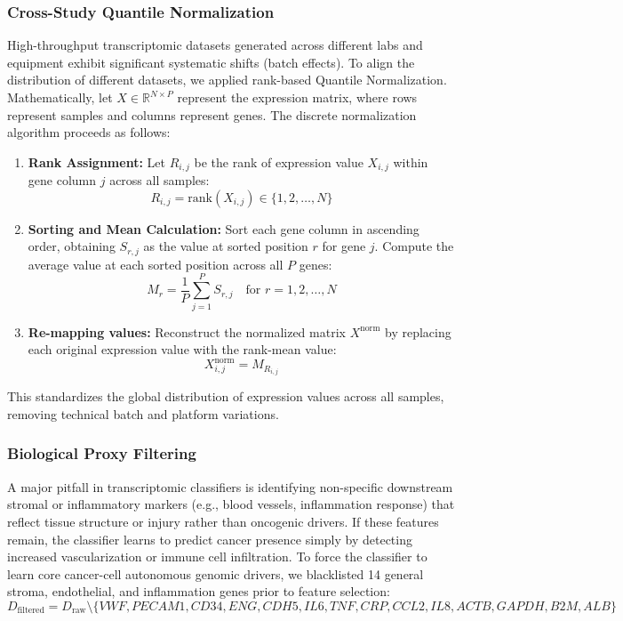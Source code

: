 \documentclass[journal,10pt]{IEEEtran}
\begin{document}
\subsubsection{Cross-Study Quantile Normalization}
High-throughput transcriptomic datasets generated across different labs and equipment exhibit significant systematic shifts (batch effects). To align the distribution of different datasets, we applied rank-based Quantile Normalization. Mathematically, let $X \in \mathbb{R}^{N \times P}$ represent the expression matrix, where rows represent samples and columns represent genes. The discrete normalization algorithm proceeds as follows:
\begin{enumerate}
    \item \textbf{Rank Assignment:} Let $R_{i,j}$ be the rank of expression value $X_{i,j}$ within gene column $j$ across all samples:
    \begin{equation}
    R_{i,j} = \text{rank}(X_{i,j}) \in \{1, 2, \dots, N\}
    \end{equation}
    \item \textbf{Sorting and Mean Calculation:} Sort each gene column in ascending order, obtaining $S_{r,j}$ as the value at sorted position $r$ for gene $j$. Compute the average value at each sorted position across all $P$ genes:
    \begin{equation}
    M_r = \frac{1}{P} \sum_{j=1}^P S_{r,j} \quad \text{for } r = 1, 2, \dots, N
    \end{equation}
    \item \textbf{Re-mapping values:} Reconstruct the normalized matrix $X^{\text{norm}}$ by replacing each original expression value with the rank-mean value:
    \begin{equation}
    X^{\text{norm}}_{i,j} = M_{R_{i,j}}
    \end{equation}
\end{enumerate}
This standardizes the global distribution of expression values across all samples, removing technical batch and platform variations.

\subsubsection{Biological Proxy Filtering}
A major pitfall in transcriptomic classifiers is identifying non-specific downstream stromal or inflammatory markers (e.g., blood vessels, inflammation response) that reflect tissue structure or injury rather than oncogenic drivers. If these features remain, the classifier learns to predict cancer presence simply by detecting increased vascularization or immune cell infiltration. To force the classifier to learn core cancer-cell autonomous genomic drivers, we blacklisted 14 general stroma, endothelial, and inflammation genes prior to feature selection:
\begin{equation}
D_{\text{filtered}} = D_{\text{raw}} \setminus \{VWF, PECAM1, CD34, ENG, CDH5, IL6, TNF, CRP, CCL2, IL8, ACTB, GAPDH, B2M, ALB\}
\end{equation}
\end{document}
